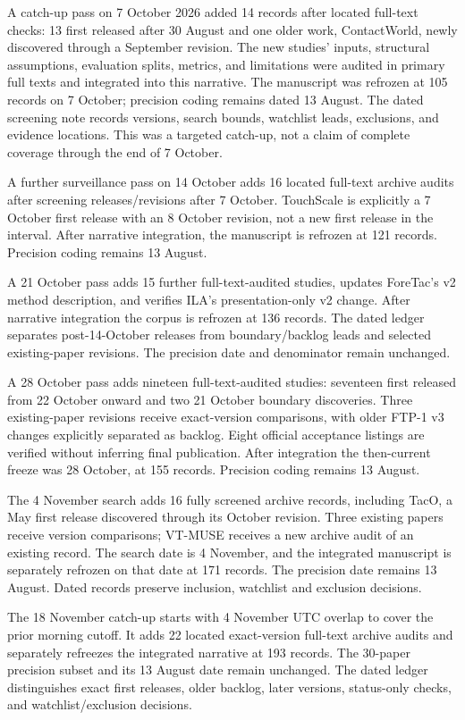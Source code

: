 A catch-up pass on 7 October 2026 added 14 records after located full-text
checks: 13 first released after 30 August and one older work, ContactWorld,
newly discovered through a September revision. The new studies' inputs,
structural assumptions, evaluation splits, metrics, and limitations were audited
in primary full texts and integrated into this narrative. The manuscript was
refrozen at 105 records on 7 October; precision coding remains dated
13 August. The dated screening note records versions, search bounds, watchlist
leads, exclusions, and evidence locations. This was a targeted catch-up, not a
claim of complete coverage through the end of 7 October.

A further surveillance pass on 14 October adds 16 located full-text archive
audits after screening releases/revisions after 7 October. TouchScale is
explicitly a 7 October first release with an 8 October revision, not a new
first release in the interval. After narrative integration, the manuscript is
refrozen at 121 records. Precision coding remains 13 August.

A 21 October pass adds 15 further full-text-audited studies, updates ForeTac's
v2 method description, and verifies ILA's presentation-only v2 change. After
narrative integration the corpus is refrozen at 136 records. The dated ledger
separates post-14-October releases from boundary/backlog leads and selected
existing-paper revisions. The precision date and denominator remain unchanged.

A 28 October pass adds nineteen full-text-audited studies: seventeen first
released from 22 October onward and two 21 October boundary discoveries. Three
existing-paper revisions receive exact-version comparisons, with older FTP-1
v3 changes explicitly separated as backlog. Eight official acceptance listings
are verified without inferring final publication. After integration the then-current
freeze was 28 October, at 155 records. Precision coding remains 13 August.

The 4 November search adds 16 fully screened archive records, including TacO,
a May first release discovered through its October revision. Three existing
papers receive version comparisons; VT-MUSE receives a new archive audit of an
existing record. The search date is 4 November, and the integrated manuscript
is separately refrozen on that date at 171 records. The precision date remains
13 August. Dated records preserve inclusion, watchlist and exclusion decisions.

The 18 November catch-up starts with 4 November UTC overlap to cover the
prior morning cutoff. It adds 22 located exact-version full-text archive audits
and separately refreezes the integrated narrative at 193 records. The
30-paper precision subset and its 13 August date remain unchanged. The dated
ledger distinguishes exact first releases, older backlog, later versions,
status-only checks, and watchlist/exclusion decisions.

